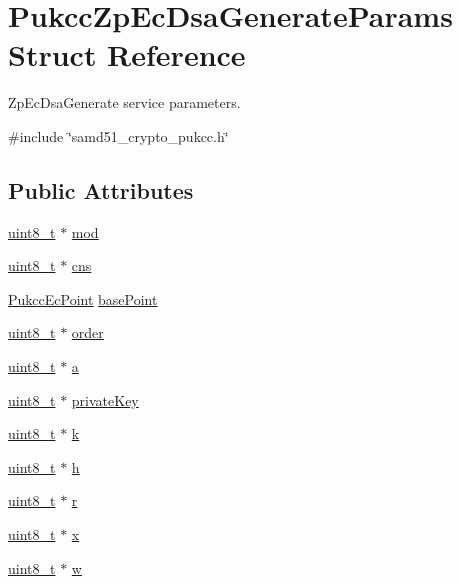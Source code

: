 \hypertarget{structPukccZpEcDsaGenerateParams}{}\section{Pukcc\+Zp\+Ec\+Dsa\+Generate\+Params Struct Reference}
\label{structPukccZpEcDsaGenerateParams}


Zp\+Ec\+Dsa\+Generate service parameters.  




{\ttfamily \#include \char`\"{}samd51\+\_\+crypto\+\_\+pukcc.\+h\char`\"{}}

\subsection*{Public Attributes}
\begin{DoxyCompactItemize}
\item 
\hyperlink{stdint_8h_aba7bc1797add20fe3efdf37ced1182c5}{uint8\+\_\+t} $\ast$ \hyperlink{structPukccZpEcDsaGenerateParams_a67476127ccca460cef6df3b10e6d4167}{mod}
\item 
\hyperlink{stdint_8h_aba7bc1797add20fe3efdf37ced1182c5}{uint8\+\_\+t} $\ast$ \hyperlink{structPukccZpEcDsaGenerateParams_aac6e39bd18aff7adcb9343b6ce2f87d9}{cns}
\item 
\hyperlink{structPukccEcPoint}{Pukcc\+Ec\+Point} \hyperlink{structPukccZpEcDsaGenerateParams_a7553b99e55e4d0f9a8187f4694e1dd21}{base\+Point}
\item 
\hyperlink{stdint_8h_aba7bc1797add20fe3efdf37ced1182c5}{uint8\+\_\+t} $\ast$ \hyperlink{structPukccZpEcDsaGenerateParams_ae5ba8660f3741c1e44f38b98460a6301}{order}
\item 
\hyperlink{stdint_8h_aba7bc1797add20fe3efdf37ced1182c5}{uint8\+\_\+t} $\ast$ \hyperlink{structPukccZpEcDsaGenerateParams_a2d987f1e1f0648a1736c0370812cc2a2}{a}
\item 
\hyperlink{stdint_8h_aba7bc1797add20fe3efdf37ced1182c5}{uint8\+\_\+t} $\ast$ \hyperlink{structPukccZpEcDsaGenerateParams_af6ee0e9db6824974381a78831ac553bb}{private\+Key}
\item 
\hyperlink{stdint_8h_aba7bc1797add20fe3efdf37ced1182c5}{uint8\+\_\+t} $\ast$ \hyperlink{structPukccZpEcDsaGenerateParams_a3de85b4e843735409b66a9f93fb9cdbb}{k}
\item 
\hyperlink{stdint_8h_aba7bc1797add20fe3efdf37ced1182c5}{uint8\+\_\+t} $\ast$ \hyperlink{structPukccZpEcDsaGenerateParams_a09558e9d9154f9d7a18f5d28230da925}{h}
\item 
\hyperlink{stdint_8h_aba7bc1797add20fe3efdf37ced1182c5}{uint8\+\_\+t} $\ast$ \hyperlink{structPukccZpEcDsaGenerateParams_af252ee26c88488da32c60609a1d2c53d}{r}
\item 
\hyperlink{stdint_8h_aba7bc1797add20fe3efdf37ced1182c5}{uint8\+\_\+t} $\ast$ \hyperlink{structPukccZpEcDsaGenerateParams_ad1e4d535ebd29d5d2282116af706e268}{x}
\item 
\hyperlink{stdint_8h_aba7bc1797add20fe3efdf37ced1182c5}{uint8\+\_\+t} $\ast$ \hyperlink{structPukccZpEcDsaGenerateParams_a2f5e57865fea17a2400913715241e356}{w}
\end{DoxyCompactItemize}


